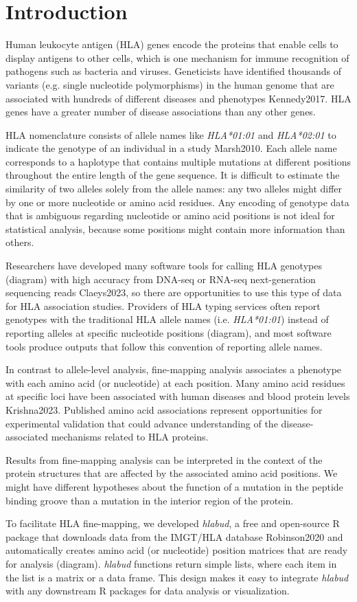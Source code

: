 \section{Introduction} \label{intro}

Human leukocyte antigen (HLA) genes encode the proteins that enable cells to display antigens to other cells, which is one mechanism for immune recognition of pathogens such as bacteria and viruses.
Geneticists have identified thousands of variants (e.g. single nucleotide polymorphisms) in the human genome that are associated with hundreds of different diseases and phenotypes Kennedy2017. HLA genes have a greater number of disease associations than any other genes.

HLA nomenclature consists of allele names like \textit{HLA*01:01} and \textit{HLA*02:01} to indicate the genotype of an individual in a study Marsh2010.
Each allele name corresponds to a haplotype that contains multiple mutations at different positions throughout the entire length of the gene sequence.
It is difficult to estimate the similarity of two alleles solely from the allele names: any two alleles might differ by one or more nucleotide or amino acid residues.
Any encoding of genotype data that is ambiguous regarding nucleotide or amino acid positions is not ideal for statistical analysis, because some positions might contain more information than others.

Researchers have developed many software tools for calling HLA genotypes (diagram) with high accuracy from DNA-seq or RNA-seq next-generation sequencing reads Claeys2023, so there are opportunities to use this type of data for HLA association studies.
Providers of HLA typing services often report genotypes with the traditional HLA allele names (i.e. \textit{HLA*01:01}) instead of reporting alleles at specific nucleotide positions (diagram), and most software tools produce outputs that follow this convention of reporting allele names.

In contrast to allele-level analysis, fine-mapping analysis associates a phenotype with each amino acid (or nucleotide) at each position.
Many amino acid residues at specific loci have been associated with human diseases and blood protein levels Krishna2023.
Published amino acid associations represent opportunities for experimental validation that could advance understanding of the disease-associated mechanisms related to HLA proteins.

Results from fine-mapping analysis can be interpreted in the context of the protein structures that are affected by the associated amino acid positions.
We might have different hypotheses about the function of a mutation in the peptide binding groove than a mutation in the interior region of the protein.

To facilitate HLA fine-mapping, we developed \textit{hlabud}, a free and open-source R package that downloads data from the IMGT/HLA database Robinson2020 and automatically creates amino acid (or nucleotide) position matrices that are ready for analysis (diagram).
\textit{hlabud} functions return simple lists, where each item in the list is a matrix or a data frame.
This design makes it easy to integrate \textit{hlabud} with any downstream R packages for data analysis or visualization.
